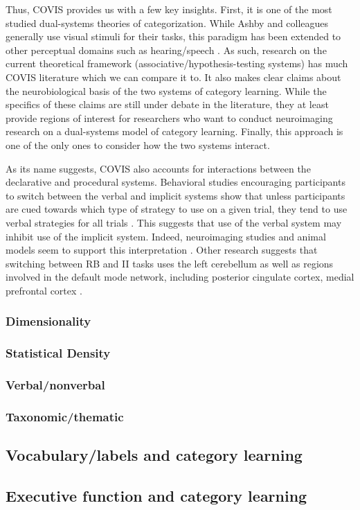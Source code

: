 \documentclass[../dissertation.tex]{subfiles}
\begin{document}
	Thus, COVIS provides us with a few key insights. First, it is one of the most studied dual-systems theories of categorization. While Ashby and colleagues generally use visual stimuli for their tasks, this paradigm has been extended to other perceptual domains such as hearing/speech \citep{Chandrasekaran2014, Chandrasekaran2016}. As such, research on the current theoretical framework (associative/hypothesis-testing systems) has much COVIS literature which we can compare it to. It also makes clear claims about the neurobiological basis of the two systems of category learning. While the specifics of these claims are still under debate in the literature, they at least provide regions of interest for researchers who want to conduct neuroimaging research on a dual-systems model of category learning. Finally, this approach is one of the only ones to consider how the two systems interact. \par
	As its name suggests, COVIS also accounts for interactions between the declarative and procedural systems. Behavioral studies encouraging participants to switch between the verbal and implicit systems show that unless participants are cued towards which type of strategy to use on a given trial, they tend to use verbal strategies for all trials \citep{Ashby2010, Erickson2008}. This suggests that use of the verbal system may inhibit use of the implicit system. Indeed, neuroimaging studies and animal models seem to support this interpretation \citep{Foerde2006, Packard1996}. Other research suggests that switching between RB and II tasks uses the left cerebellum as well as regions involved in the default mode network, including posterior cingulate cortex, medial prefrontal cortex \citep{Turner2017}.
	
\subsubsection{Dimensionality}
\subsubsection{Statistical Density}
\subsubsection{Verbal/nonverbal}
\subsubsection{Taxonomic/thematic}

 
\subsection{Vocabulary/labels and category learning}

\subsection{Executive function and category learning}
\end{document}
